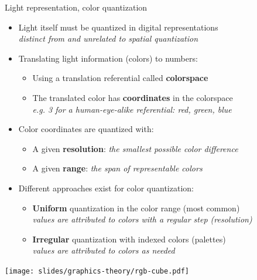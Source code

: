 \begin{frame}{Light representation, color quantization}
  \begin{minipage}[c]{0.75\textwidth}
    \begin{itemize}
    \item Light itself must be quantized in digital representations\\
    \textit{distinct from and unrelated to spatial quantization}
    \item Translating light information (colors) to numbers:
      \begin{itemize}
      \item Using a translation referential called \textbf{colorspace}
      \item The translated color has \textbf{coordinates} in the colorspace\\
      \textit{e.g. 3 for a human-eye-alike referential: red, green, blue}
      \end{itemize}
    \item Color coordinates are quantized with:
      \begin{itemize}
      \item A given \textbf{resolution}:
      \textit{the smallest possible color difference}
      \item A given \textbf{range}:
      \textit{the span of representable colors}
      \end{itemize}
    \item Different approaches exist for color quantization:
      \begin{itemize}
      \item \textbf{Uniform} quantization in the color range (most common)\\
        \textit{values are attributed to colors with a regular step (resolution)}
      \item \textbf{Irregular} quantization with indexed colors (palettes)\\
        \textit{values are attributed to colors as needed}
      \end{itemize}
    \end{itemize}
  \end{minipage}
  \hfill
  \begin{minipage}[c]{0.225\textwidth}
    \centering
    \texttt{[image: slides/graphics-theory/rgb-cube.pdf]}
  \end{minipage}
\end{frame}

